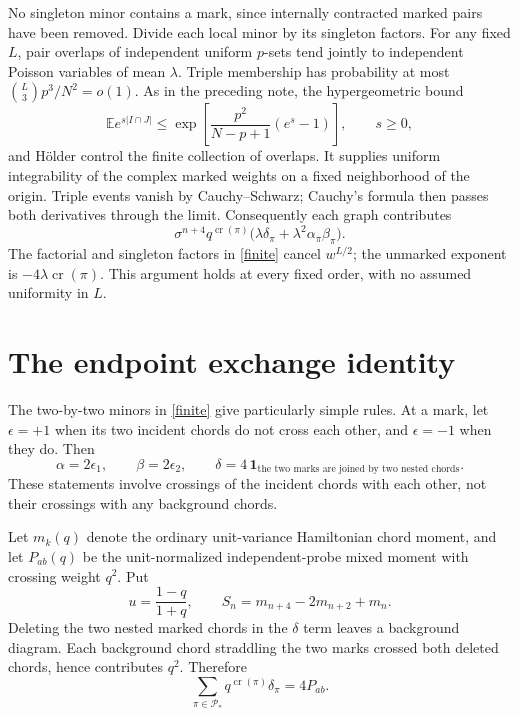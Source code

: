 \documentclass[11pt,a4paper]{article}
\newcommand{\E}{\mathbb E}
\begin{document}
No singleton minor contains a mark, since internally contracted marked
pairs have been removed. Divide each local minor by its singleton factors.
For any fixed $L$, pair overlaps of independent uniform $p$-sets tend
jointly to independent Poisson variables of mean $\lambda$. Triple
membership has probability at most $\binom L3p^3/N^2=o(1)$.
As in the preceding note, the hypergeometric bound
\begin{equation}
 \E e^{s|I\cap J|}\le
 \exp\!\left[\frac{p^2}{N-p+1}(e^s-1)\right],\qquad s\ge0,
\end{equation}
and H\"older control the finite collection of overlaps. It supplies
uniform integrability of the complex marked weights on a fixed
neighborhood of the origin. Triple events vanish by Cauchy--Schwarz;
Cauchy's formula then passes both derivatives through the limit.
Consequently each graph contributes
\begin{equation}
 \sigma^{n+4}q^{\operatorname{cr}(\pi)}
 \bigl(\lambda\delta_\pi+\lambda^2\alpha_\pi\beta_\pi\bigr).\label{graph}
\end{equation}
The factorial and singleton factors in \eqref{finite} cancel $w^{L/2}$;
the unmarked exponent is $-4\lambda\operatorname{cr}(\pi)$.
This argument holds at every fixed order, with no assumed uniformity in $L$.

\newpage
\section{The endpoint exchange identity}
The two-by-two minors in \eqref{finite} give particularly simple rules.
At a mark, let $\epsilon=+1$ when its two incident chords do not cross
each other, and $\epsilon=-1$ when they do. Then
\begin{equation}
 \alpha=2\epsilon_1,\qquad\beta=2\epsilon_2,\qquad
 \delta=4\,\mathbf1_{\text{the two marks are joined by two nested chords}}.
 \label{rules}
\end{equation}
These statements involve crossings of the incident chords with each
other, not their crossings with any background chords.

Let $m_k(q)$ denote the ordinary unit-variance Hamiltonian chord moment,
and let $P_{ab}(q)$ be the unit-normalized independent-probe mixed moment
with crossing weight $q^2$. Put
\begin{equation}
 u=\frac{1-q}{1+q},\qquad
 S_n=m_{n+4}-2m_{n+2}+m_n.
\end{equation}
Deleting the two nested marked chords in the $\delta$ term leaves a
background diagram. Each background chord straddling the two marks
crossed both deleted chords, hence contributes $q^2$. Therefore
\begin{equation}
 \sum_{\pi\in\mathcal P_*}q^{\operatorname{cr}(\pi)}\delta_\pi
 =4P_{ab}.\label{delta}
\end{equation}
\end{document}
